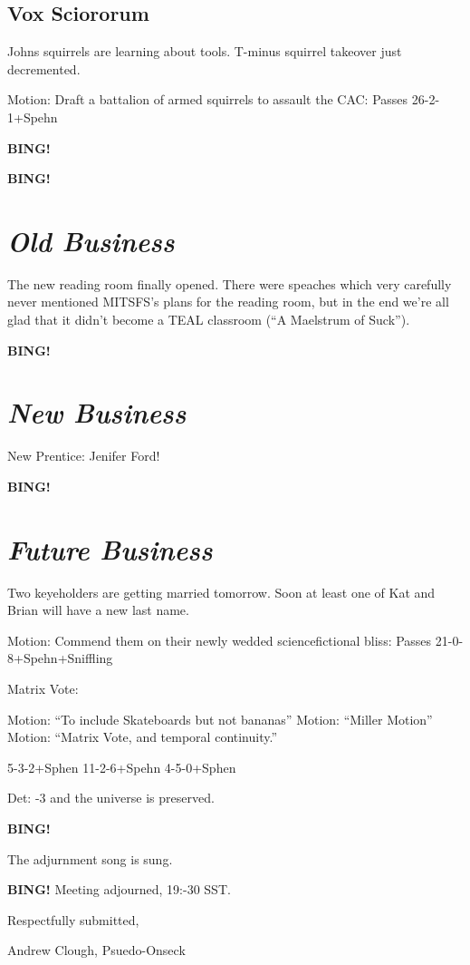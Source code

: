 \documentclass[10pt]{article}
\newcommand{\bing}{{\bf BING!} }
\newcommand{\goto}[1]{\bing \vskip 12pt \section*{{\em{#1}}}}
\begin{document}



\subsection*{Vox Sciororum}

Johns squirrels are learning about tools.  T-minus squirrel takeover just decremented.

Motion:  Draft a battalion of armed squirrels to assault the CAC:  Passes 26-2-1+Spehn

\bing

\goto{Old Business}

The new reading room finally opened.  There were speaches which very carefully never mentioned MITSFS's plans for the reading room, but in the end we're all glad that it didn't become a TEAL classroom (``A Maelstrum of Suck'').

\goto{New Business}

New Prentice:  Jenifer Ford!

\goto{Future Business}

Two keyeholders are getting married tomorrow.  Soon at least one of Kat and Brian will have a new last name.

Motion:  Commend them on their newly wedded sciencefictional bliss:  Passes 21-0-8+Spehn+Sniffling

Matrix Vote:

Motion:  ``To include Skateboards but not bananas''  
Motion:  ``Miller Motion''
Motion:  ``Matrix Vote, and temporal continuity.''

5-3-2+Sphen
11-2-6+Spehn
4-5-0+Sphen

Det:  -3 and the universe is preserved.

\bing

The adjurnment song is sung.

\bing
\noindent
Meeting adjourned, 19:-30 SST.

\vspace{18pt}

\centerline{Respectfully submitted,}
\centerline{Andrew Clough, Psuedo-Onseck}
\end{document}
